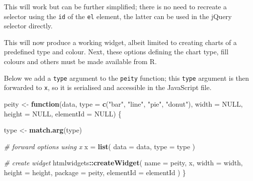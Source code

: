 \documentclass[
  10pt,
]{krantz}
\makeatletter
\newenvironment{Shaded}{\begin{snugshade}}{\end{snugshade}}
\newcommand{\AttributeTok}[1]{\textcolor[rgb]{0.61,0.61,0.61}{#1}}
\newcommand{\CommentTok}[1]{\textcolor[rgb]{0.37,0.37,0.37}{\textit{#1}}}
\newcommand{\ControlFlowTok}[1]{\textcolor[rgb]{0.27,0.27,0.27}{\textbf{#1}}}
\newcommand{\DataTypeTok}[1]{\textcolor[rgb]{0.27,0.27,0.27}{#1}}
\newcommand{\KeywordTok}[1]{\textcolor[rgb]{0.27,0.27,0.27}{\textbf{#1}}}
\newcommand{\NormalTok}[1]{#1}
\newcommand{\OperatorTok}[1]{\textcolor[rgb]{0.43,0.43,0.43}{\textbf{#1}}}
\newcommand{\OtherTok}[1]{\textcolor[rgb]{0.37,0.37,0.37}{#1}}
\newcommand{\StringTok}[1]{\textcolor[rgb]{0.5,0.5,0.5}{#1}}
\newenvironment{kframe}{%
\medskip{}
\setlength{\fboxsep}{.8em}
 \def\at@end@of@kframe{}%
 \ifinner\ifhmode%
  \def\at@end@of@kframe{\end{minipage}}%
  \begin{minipage}{\columnwidth}%
 \fi\fi%
 \def\FrameCommand##1{\hskip\@totalleftmargin \hskip-\fboxsep
 \colorbox{shadecolor}{##1}\hskip-\fboxsep
     \hskip-\linewidth \hskip-\@totalleftmargin \hskip\columnwidth}%
 \MakeFramed {\advance\hsize-\width
   \@totalleftmargin\z@ \linewidth\hsize
   \@setminipage}}%
 {\par\unskip\endMakeFramed%
 \at@end@of@kframe}
\renewenvironment{Shaded}{\begin{kframe}}{\end{kframe}}
\makeatother
\begin{document}
This will work but can be further simplified; there is no need to recreate a selector using the \texttt{id} of the \texttt{el} element, the latter can be used in the jQuery selector directly.

\begin{Shaded}
\end{Shaded}

This will now produce a working widget, albeit limited to creating charts of a predefined type and colour. Next, these options defining the chart type, fill colours and others must be made available from R.

Below we add a \texttt{type} argument to the \texttt{peity} function; this \texttt{type} argument is then forwarded to \texttt{x}, so it is serialised and accessible in the JavaScript file.

\begin{Shaded}
\begin{Highlighting}[]
\NormalTok{peity <{-}}\StringTok{ }\ControlFlowTok{function}\NormalTok{(data, }\DataTypeTok{type =} \KeywordTok{c}\NormalTok{(}\StringTok{"bar"}\NormalTok{, }\StringTok{"line"}\NormalTok{, }\StringTok{"pie"}\NormalTok{, }\StringTok{"donut"}\NormalTok{), }
  \DataTypeTok{width =} \OtherTok{NULL}\NormalTok{, }\DataTypeTok{height =} \OtherTok{NULL}\NormalTok{, }\DataTypeTok{elementId =} \OtherTok{NULL}\NormalTok{) \{}

\NormalTok{  type <{-}}\StringTok{ }\KeywordTok{match.arg}\NormalTok{(type)}

  \CommentTok{\# forward options using x}
\NormalTok{  x =}\StringTok{ }\KeywordTok{list}\NormalTok{(}
    \DataTypeTok{data =}\NormalTok{ data,}
    \DataTypeTok{type =}\NormalTok{ type}
\NormalTok{  )}

  \CommentTok{\# create widget}
\NormalTok{  htmlwidgets}\OperatorTok{::}\KeywordTok{createWidget}\NormalTok{(}
    \DataTypeTok{name =} \StringTok{\textquotesingle{}peity\textquotesingle{}}\NormalTok{,}
\NormalTok{    x,}
    \DataTypeTok{width =}\NormalTok{ width,}
    \DataTypeTok{height =}\NormalTok{ height,}
    \DataTypeTok{package =} \StringTok{\textquotesingle{}peity\textquotesingle{}}\NormalTok{,}
    \DataTypeTok{elementId =}\NormalTok{ elementId}
\NormalTok{  )}
\NormalTok{\}}
\end{Highlighting}
\end{Shaded}
\end{document}
